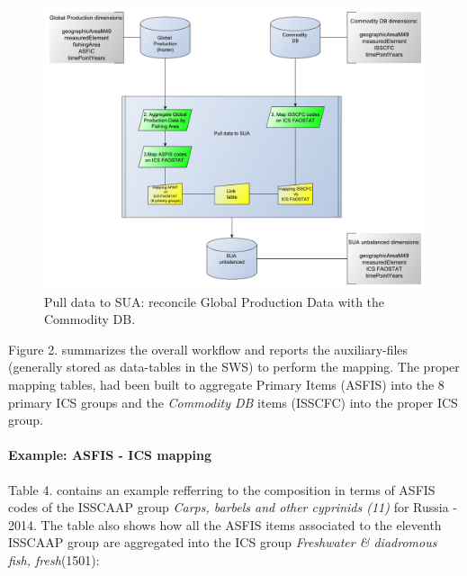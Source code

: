 \documentclass[nojss]{jss}
\begin{document}
\begin{figure}
\includegraphics{flow-charts/pullDataToSUA/focusOnCompileSUA_Unbalanced.pdf}
\caption{Pull data to SUA: reconcile Global Production Data with the Commodity DB.}
\end{figure}


Figure 2. summarizes the overall workflow and reports the auxiliary-files (generally stored as data-tables in the SWS) to perform the mapping. The proper mapping tables, had been built to aggregate Primary Items (ASFIS) into the 8 primary ICS groups and the \textit{Commodity DB} items (ISSCFC) into the proper ICS group.

\paragraph{Example: ASFIS - ICS mapping}

Table 4. contains an example refferring to the composition in terms of ASFIS codes of the ISSCAAP group \textit{Carps, barbels and other cyprinids (11)} for Russia - 2014. The table also shows how all the ASFIS items associated to the eleventh ISSCAAP group are aggregated into the ICS group \textit{Freshwater & diadromous fish, fresh}(1501):
\end{document}
